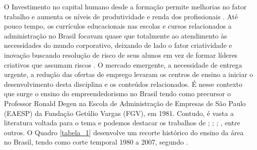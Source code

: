 O Investimento no  capital  humano desde a formação permite  melhorias  no fator trabalho e aumenta os níveis de produtividade e renda dos profissionais \cite{macedo_capital_2019}. Até pouco tempo, os currículos educacionais nas escolas e cursos relacionados a administração no Brasil focavam quase que totalmente ao atendimento às necessidades do mundo corporativo, deixando de lado o fator criatividade e inovação buscando resolução de risco de seus alunos em vez de formar líderes criativos que assumam riscos \cite{sanna_evolution_1999}. O mercado emergente, a necessidade de entrega urgente, a redução das ofertas de emprego levaram os centros de ensino a iniciar o desenvolvimento desta disciplina e os conteúdos relacionados. É nesse contexto que surge o ensino do empreendedorismo no Brasil tendo como precursor o Professor Ronald Degen \cite{koerner_designing_1990} na Escola de Administração de Empresas de São Paulo (EAESP) da Fundação Getúlio Vargas (FGV), em 1981. Contudo, é vasta a literatura voltada para o tema e podemos destacar os trabalhos de  ; ; ; ,  entre outros. O Quadro \ref{tabela_1} desenvolve um recorte histórico do ensino da área no Brasil, tendo como corte temporal 1980 a 2007, segundo \cite{fernandes_breve_2013}. 




